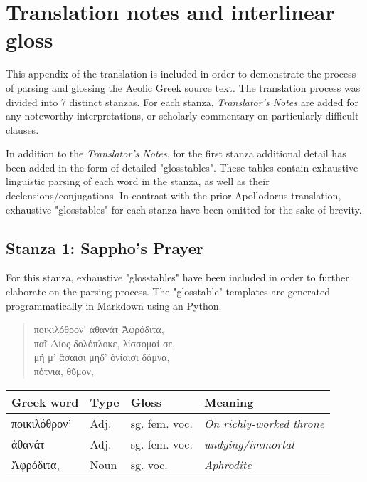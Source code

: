 \section*{Translation notes and interlinear gloss}
This appendix of the translation is included in order to demonstrate the process of parsing and glossing the Aeolic Greek source text. The translation process was divided into 7 distinct stanzas. For each stanza, \emph{Translator's Notes} are added for any noteworthy interpretations, or scholarly commentary on particularly difficult clauses.

In addition to the \emph{Translator's Notes}, for the first stanza additional detail has been added in the form of detailed "glosstables". These tables contain exhaustive linguistic parsing of each word in the stanza, as well as their declensions/conjugations. In contrast with the prior Apollodorus translation, exhaustive "glosstables" for each stanza have been omitted for the sake of brevity.

\subsection*{Stanza 1: Sappho's Prayer}
For this stanza, exhaustive "glosstables" have been included in order to further elaborate on the parsing process. The
"glosstable" templates are generated programmatically in Markdown using an Python.

\begin{quote}
  ποικιλόθρον’ ἀθανάτ Ἀφρόδιτα,\\
  παῖ Δίος δολόπλοκε, λίσσομαί σε,\\
  μή μ’ ἄσαισι μηδ’ ὀνίαισι δάμνα,\\
  πότνια, θῦμον,\\
\end{quote}

\begin{table}[H]
\begin{tabular}{@{}llll@{}}
\toprule
\textbf{Greek word} & \textbf{Type} & \textbf{Gloss}      & \textbf{Meaning}                 \\ \midrule
ποικιλόθρον'        & Adj.          & sg. fem. voc. & \textit{On richly-worked throne} \\
ἀθανάτ              & Adj.          & sg. fem. voc. & \textit{undying/immortal}        \\
Ἀφρόδιτα,           & Noun          & sg. voc.            & \textit{Aphrodite}               \\ \bottomrule
\end{tabular}
\end{table}


